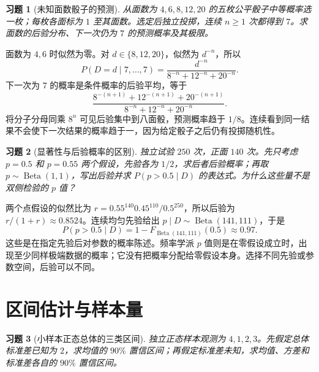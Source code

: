 \documentclass[UTF8,12pt,a4paper,fontset=fandol]{ctexart}
\newtheorem{exercise}{习题}[section]
\begin{document}
\begin{exercise}[未知面数骰子的预测]\label{q:M-P7-2}
从面数为 $4,6,8,12,20$ 的五枚公平骰子中等概率选一枚；每枚各面标为 $1$ 至其面数。选定后独立投掷，连续 $n\ge1$ 次都得到 $7$。求面数的后验分布、下一次仍为 $7$ 的预测概率及其极限。\par{}
\end{exercise}

\begin{solve}\label{a:M-P7-2}面数为 $4,6$ 时似然为零。对 $d\in\{8,12,20\}$，似然为 $d^{-n}$，所以\[P(D=d\mid7,\ldots,7)=\frac{d^{-n}}{8^{-n}+12^{-n}+20^{-n}}.\]下一次为 $7$ 的概率是条件概率的后验平均，等于\[\frac{8^{-(n+1)}+12^{-(n+1)}+20^{-(n+1)}}{8^{-n}+12^{-n}+20^{-n}}.\]将分子分母同乘 $8^n$ 可见后验集中到八面骰，预测概率趋于 $1/8$。连续看到同一结果不会使下一次结果的概率趋于一，因为给定骰子之后仍有投掷随机性。\end{solve}

\begin{exercise}[显著性与后验概率的区别]\label{q:M-P8-1fg}
独立试验 $250$ 次，正面 $140$ 次。先只考虑 $p=0.5$ 和 $p=0.55$ 两个假设，先验各为 $1/2$，求后者后验概率；再取 $p\sim\operatorname{Beta}(1,1)$，写出后验并求 $P(p>0.5\mid D)$ 的表达式。为什么这些量不是双侧检验的 $p$ 值？\par{}
\end{exercise}

\begin{solve}\label{a:M-P8-1fg}两个点假设的似然比为 $r=0.55^{140}0.45^{110}/0.5^{250}$，所以后验为 $r/(1+r)\approx0.8524$。连续均匀先验给出 $p\mid D\sim\operatorname{Beta}(141,111)$，于是\[P(p>0.5\mid D)=1-F_{\operatorname{Beta}(141,111)}(0.5)\approx0.97.\]这些是在指定先验后对参数的概率陈述。频率学派 $p$ 值则是在零假设成立时，出现至少同样极端数据的概率；它没有把概率分配给零假设本身。选择不同先验或参数空间，后验可以不同。\end{solve}

\clearpage\section{区间估计与样本量}

\begin{exercise}[小样本正态总体的三类区间]\label{q:M-C22-1}
独立正态样本观测为 $4,1,2,3$。先假定总体标准差已知为 $2$，求均值的 $90\%$ 置信区间；再假定标准差未知，求均值、方差和标准差各自的 $90\%$ 置信区间。\par{}
\end{exercise}
\end{document}
